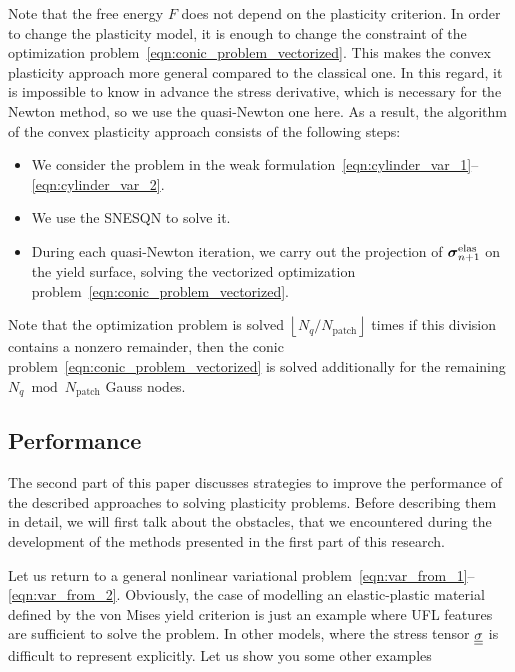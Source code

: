 \documentclass[12pt]{article}
\begin{document}
Note that the free energy $F$ does not depend on the plasticity criterion. In order to change the plasticity model, it is enough to change the constraint of the optimization problem~\eqref{eqn:conic_problem_vectorized}. This makes the convex plasticity approach more general compared to the classical one. In this regard, it is impossible to know in advance the stress derivative, which is necessary for the Newton method, so we use the quasi-Newton one here. As a result, the algorithm of the convex plasticity approach consists of the following steps:
\begin{itemize}
    \item We consider the problem in the weak formulation~\eqref{eqn:cylinder_var_1}--\eqref{eqn:cylinder_var_2}.
    \item We use the SNESQN  to solve it.
    \item During each quasi-Newton iteration, we carry out the projection of $\mbox{\boldmath $\sigma$}^\text{elas}_{n+1}$ on the yield surface, solving the vectorized optimization problem~\eqref{eqn:conic_problem_vectorized}.
\end{itemize}
Note that the optimization problem is solved $\left\lfloor N_q / N_\text{patch}\right\rfloor$ times if this division contains a nonzero remainder, then the conic problem~\eqref{eqn:conic_problem_vectorized} is solved additionally for the remaining $N_q \bmod N_\text{patch}$ Gauss nodes. 

\subsection{Performance}
\label{sec:performance}

The second part of this paper discusses strategies to improve the performance of the described approaches to solving plasticity problems. Before describing them in detail, we will first talk about the obstacles, that we encountered during the development of the methods presented in the first part of this research. 


Let us return to a general nonlinear variational problem~\eqref{eqn:var_from_1}--\eqref{eqn:var_from_2}. Obviously, the case of modelling an elastic-plastic material defined by the von Mises yield criterion is just an example where UFL features are sufficient to solve the problem. In other models, where the stress tensor $\underline{\underline{\sigma}}$ is difficult to represent explicitly. Let us show you some other examples
\end{document}
